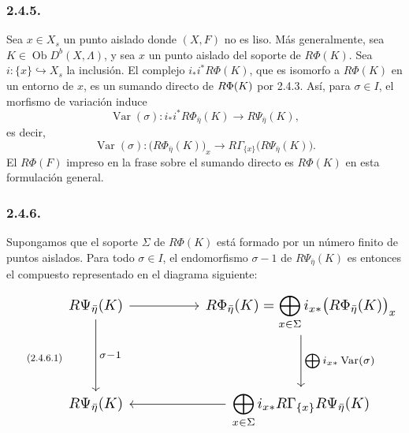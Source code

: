 \subsubsection*{2.4.5.}
Sea $x\in X_s$ un punto aislado donde $(X,F)$ no es liso. Más generalmente,
sea $K\in\operatorname{Ob}D^b(X,\Lambda)$, y sea $x$ un punto aislado del
soporte de $R\Phi(K)$. Sea $i:\{x\}\hookrightarrow X_s$ la inclusión. El
complejo $i_*i^*R\Phi(K)$, que es isomorfo a $R\Phi(K)$ en un entorno de $x$,
es un sumando directo de $R\Phi(\sisi{F}{K})$ por 2.4.3. Así, para
$\sigma\in I$, el morfismo de variación induce
\[
\operatorname{Var}(\sigma):
i_*i^*R\Phi_{\bar\eta}(K)\longrightarrow R\Psi_{\bar\eta}(K),
\]
es decir,
\begin{equation}\tag{2.4.5.1}
\operatorname{Var}(\sigma):
\bigl(R\Phi_{\bar\eta}(K)\bigr)_x
\longrightarrow
R\Gamma_{\{x\}}\bigl(R\Psi_{\bar\eta}(K)\bigr).
\end{equation}
El $R\Phi(F)$ impreso en la frase sobre el sumando directo es $R\Phi(K)$ en
esta formulación general.

\subsubsection*{2.4.6.}
Supongamos que el soporte $\Sigma$ de $R\Phi(K)$ está formado por un número
finito de puntos aislados. Para todo $\sigma\in I$, el endomorfismo $\sigma-1$
de $R\Psi_{\bar\eta}(K)$ es entonces el compuesto representado en el diagrama
siguiente:
\begin{equation}\tag{2.4.6.1}
\resizebox{\textwidth}{!}{%
\begin{tikzcd}[ampersand replacement=\&, column sep=huge, row sep=huge]
R\Psi_{\bar\eta}(K)
  \arrow[r] \arrow[d, "\sigma-1"]
  \& R\Phi_{\bar\eta}(K)
     =\displaystyle\bigoplus_{x\in\Sigma}
       i_{x*}\bigl(R\Phi_{\bar\eta}(K)\bigr)_x
     \arrow[d, "{\bigoplus i_{x*}\operatorname{Var}(\sigma)}"] \\
R\Psi_{\bar\eta}(K)
  \& \displaystyle\bigoplus_{x\in\Sigma}
       i_{x*}R\Gamma_{\{x\}}R\Psi_{\bar\eta}(K)
     \arrow[l]
\end{tikzcd}}
\end{equation}

